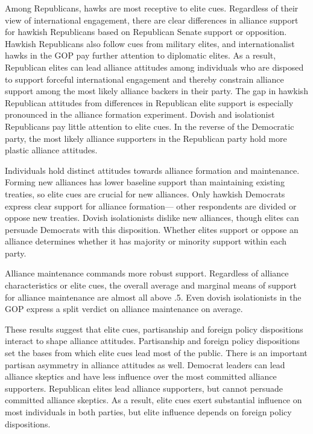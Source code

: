 \documentclass[12pt]{article}
\begin{document}
Among Republicans, hawks are most receptive to elite cues. 
Regardless of their view of international engagement, there are clear differences in alliance support for hawkish Republicans based on Republican Senate support or opposition.
Hawkish Republicans also follow cues from military elites, and internationalist hawks in the GOP pay further attention to diplomatic elites. 
As a result, Republican elites can lead alliance attitudes among individuals who are disposed to support forceful international engagement and thereby constrain alliance support among the most likely alliance backers in their party. 
The gap in hawkish Republican attitudes from differences in Republican elite support is especially pronounced in the alliance formation experiment. 
Dovish and isolationist Republicans pay little attention to elite cues. 
In the reverse of the Democratic party, the most likely alliance supporters in the Republican party hold more plastic alliance attitudes. 




Individuals hold distinct attitudes towards alliance formation and maintenance. 
Forming new alliances has lower baseline support than maintaining existing treaties, so elite cues are crucial for new alliances. 
Only hawkish Democrats express clear support for alliance formation--- other respondents are divided or oppose new treaties.
Dovish isolationists dislike new alliances, though elites can persuade Democrats with this disposition. 
Whether elites support or oppose an alliance determines whether it has majority or minority support within each party. 


Alliance maintenance commands more robust support. 
Regardless of alliance characteristics or elite cues, the overall average and marginal means of support for alliance maintenance are almost all above .5. 
Even dovish isolationists in the GOP express a split verdict on alliance maintenance on average.


These results suggest that elite cues, partisanship and foreign policy dispositions interact to shape alliance attitudes.
Partisanship and foreign policy dispositions set the bases from which elite cues lead most of the public. 
There is an important partisan asymmetry in alliance attitudes as well. 
Democrat leaders can lead alliance skeptics and have less influence over the most committed alliance supporters. 
Republican elites lead alliance supporters, but cannot persuade committed alliance skeptics. 
As a result, elite cues exert substantial influence on most individuals in both parties, but elite influence depends on foreign policy dispositions. 
\end{document}
